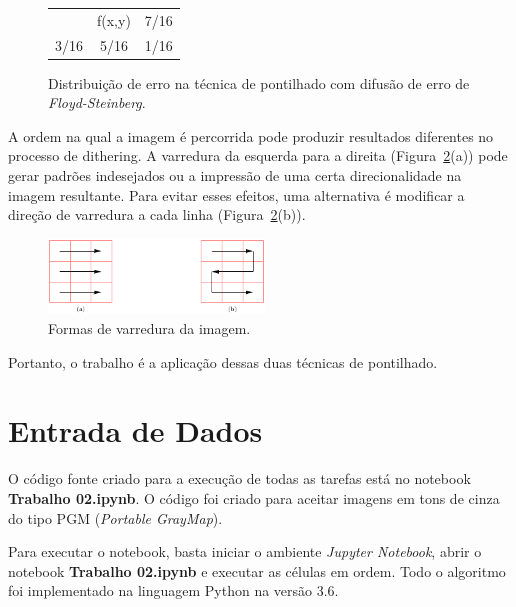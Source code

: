 \documentclass[twoside,twocolumn]{article}
\begin{document}
\begin{figure}[H]
\begin{center}
	\begin{tabular}{|c|c|c|}
\hline
     &        &      \\ \hline
     & f(x,y) & 7/16 \\ \hline
3/16 & 5/16   & 1/16 \\ \hline
\end{tabular}
\caption{Distribuição de erro na técnica de pontilhado com difusão de erro de \textit{Floyd-Steinberg}.} \label{distribuicao}
\end{center}
\end{figure}

A ordem na qual a imagem é percorrida pode produzir resultados diferentes no processo de dithering. A varredura da esquerda para a direita (Figura~\ref{varredura}(a)) pode gerar padrões indesejados ou a impressão de uma certa direcionalidade na imagem resultante. Para evitar esses efeitos, uma alternativa é modificar a direção de varredura a cada linha (Figura~\ref{varredura}(b)).

\begin{figure}[H]
\begin{center}
	\includegraphics[height=2cm]{figures/varredura.png}
\caption{Formas de varredura da imagem.} \label{varredura}
\end{center}
\end{figure}

Portanto, o trabalho é a aplicação dessas duas técnicas de pontilhado.


\section{Entrada de Dados}

O código fonte criado para a execução de todas as tarefas está no notebook \textbf{Trabalho 02.ipynb}. O código foi criado para aceitar imagens em tons de cinza do tipo PGM (\textit{Portable GrayMap}).

Para executar o notebook, basta iniciar o ambiente \textit{Jupyter Notebook}, abrir o notebook \textbf{Trabalho 02.ipynb} e executar as células em ordem. Todo o algoritmo foi implementado na linguagem Python na versão 3.6.
\end{document}
